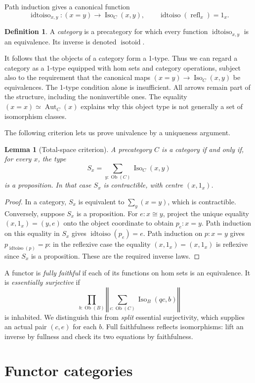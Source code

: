 \documentclass[11pt]{amsart}
\newtheorem{lemma}[theorem]{Lemma}
\theoremstyle{definition}
\newtheorem{definition}[theorem]{Definition}
\theoremstyle{remark}
\newcommand{\Iso}{\operatorname{Iso}}
\newcommand{\Ob}{\operatorname{Ob}}
\newcommand{\tr}[1]{\left\Vert #1\right\Vert}
\begin{document}
Path induction gives a canonical function
\[
 \operatorname{idtoiso}_{x,y}:(x=y)\longrightarrow\Iso_C(x,y),
 \qquad \operatorname{idtoiso}(\operatorname{refl}_x)=1_x.
\]
\begin{definition}
A \emph{category} is a precategory for which every function
$\operatorname{idtoiso}_{x,y}$ is an equivalence. Its inverse is denoted
$\operatorname{isotoid}$.
\end{definition}
It follows that the objects of a category form a 1-type. Thus we can
regard a category as a 1-type equipped with hom sets and category
operations, subject also to the requirement that the canonical maps
$(x=y)\to\Iso_C(x,y)$ be equivalences. The 1-type condition alone is
insufficient. All arrows remain part of the structure, including the
noninvertible ones. The equality $(x=x)\simeq\operatorname{Aut}_C(x)$
explains why this object type is not generally a set of isomorphism classes.

\pagebreak[3]
The following criterion lets us prove univalence by a uniqueness argument.
\begin{lemma}[Total-space criterion]\label{lem:total}
A precategory $C$ is a category if and only if, for every $x$, the type
\[
 S_x=\sum_{y:\Ob(C)}\Iso_C(x,y)
\]
is a proposition. In that case $S_x$ is contractible, with centre $(x,1_x)$.
\end{lemma}
\begin{proof}
In a category, $S_x$ is equivalent to $\sum_y(x=y)$, which is contractible.
Conversely, suppose $S_x$ is a proposition. For $e:x\cong y$, project the
unique equality $(x,1_x)=(y,e)$ onto the object coordinate to obtain
$p_e:x=y$. Path induction on this equality in $S_x$ gives
$\operatorname{idtoiso}(p_e)=e$. Path induction on $p:x=y$ gives
$p_{\operatorname{idtoiso}(p)}=p$: in the reflexive case the equality
$(x,1_x)=(x,1_x)$ is reflexive since $S_x$ is a proposition.
These are the required inverse laws.
\end{proof}

A functor is \emph{fully faithful} if each of its functions on hom sets
is an equivalence. It is \emph{essentially surjective} if
\[
 \prod_{b:\Ob(B)}\tr{\sum_{c:\Ob(C)}\Iso_B(qc,b)}
\]
is inhabited. We distinguish this from \emph{split} essential
surjectivity, which supplies an actual pair $(c,e)$ for each $b$.
Full faithfulness reflects isomorphisms: lift an inverse by fullness and
check its two equations by faithfulness.

\section{Functor categories}
\end{document}

